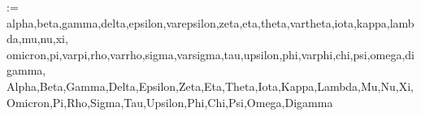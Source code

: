 
\newcommand{\savesffamily}{\sfdefault}
\makeatletter
\newcommand{\savesfmdseries}{\mdseries@sf}
\newcommand{\savesfbfseries}{\bfseries@sf}
\makeatother

\usepackage[textmd, semibold, scale=0.91]{plex-serif}
\let \savermfamily \rmdefault
\makeatletter
\newcommand{\savermmdseries}{\mdseries@rm}
\newcommand{\savermbfseries}{\bfseries@rm}
\makeatother

\makeatletter
\@for\@tempa:=%
	alpha,beta,gamma,delta,epsilon,varepsilon,zeta,eta,theta,vartheta,iota,kappa,lambda,mu,nu,xi,%
	omicron,pi,varpi,rho,varrho,sigma,varsigma,tau,upsilon,phi,varphi,chi,psi,omega,digamma,%
	Alpha,Beta,Gamma,Delta,Epsilon,Zeta,Eta,Theta,Iota,Kappa,Lambda,Mu,Nu,Xi,%
	Omicron,Pi,Rho,Sigma,Tau,Upsilon,Phi,Chi,Psi,Omega,Digamma%
\do{%
	\expandafter\let\csname up\@tempa\expandafter\endcsname\csname\@tempa up\endcsname%
}%
\makeatother

\ifx\nequiv\undefined
	\newcommand{\nequiv}{\not\equiv}
\fi

\let \savermdefaultfortext \rmdefault
\let \savemddefaultfortext \mddefault
\let \savebfdefaultfortext \bfdefault
\renewcommand{\textellipsis}{\mbox{.{\kern.09em}.{\kern.09em}.}}

